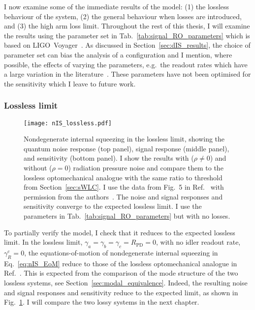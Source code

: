 
I now examine some of the immediate results of the model: (1) the lossless behaviour of the system, (2) the general behaviour when losses are introduced, and (3) the high arm loss limit.
Throughout the rest of this thesis, I will examine the results using the parameter set in Tab.~\ref{tab:signal_RO_parameters} which is based on LIGO~Voyager~\cite{}. As discussed in Section~\ref{sec:dIS_results}, the choice of parameter set can bias the analysis of a configuration and I mention, where possible, the effects of varying the parameters, e.g.\ the readout rates which have a large variation in the literature~\cite{}. These parameters have not been optimised for the sensitivity which I leave to future work. %

\subsubsection{Lossless limit}
\label{sec:nIS_lossless_limit}

\begin{figure}
    \centering
    \texttt{[image: nIS\_lossless.pdf]}
    \caption{Nondegenerate internal squeezing in the lossless limit, showing the quantum noise response (top panel), signal response (middle panel), and sensitivity (bottom panel). I show the results with ($\rho\neq0$) and without ($\rho=0$) radiation pressure noise and compare them to the lossless optomechanical analogue with the same ratio to threshold from Section~\ref{sec:sWLC}. I use the data from Fig.~5 in Ref.~\cite{liBroadbandSensitivityImprovement2020} with permission from the authors~\cite{xiangLiPersonalCommunication}. The noise and signal responses and sensitivity converge to the expected lossless limit. I use the parameters in Tab.~\ref{tab:signal_RO_parameters} but with no losses.}
    \label{fig:nIS_lossless}
\end{figure}

To partially verify the model, I check that it reduces to the expected lossless limit.
In the lossless limit, $\gamma_a=\gamma_b=\gamma_c=R_\text{PD}=0$, with no idler readout rate, $\gamma^c_R=0$, the equations-of-motion of nondegenerate internal squeezing in Eq.~\ref{eq:nIS_EoM} reduce to those of the lossless optomechanical analogue in Ref.~\cite{liBroadbandSensitivityImprovement2020}. This is expected from the comparison of the mode structure of the two lossless systems, see Section~\ref{sec:modal_equivalence}.
Indeed, the resulting noise and signal responses and sensitivity reduce to the expected limit, as shown in Fig.~\ref{fig:nIS_lossless}.
I will compare the two lossy systems in the next chapter. 

